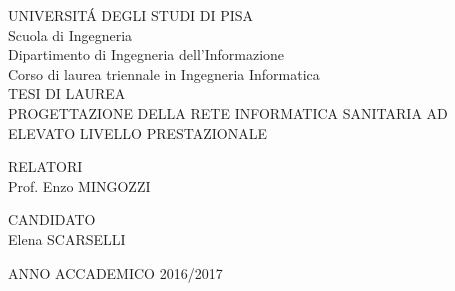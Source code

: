 \begin{titlepage}
    \begin{center}
      UNIVERSIT\'{A} DEGLI STUDI DI PISA\\
      Scuola di Ingegneria\\
      Dipartimento di Ingegneria dell'Informazione\\
      Corso di laurea triennale in Ingegneria Informatica\\
      \vspace*{5\baselineskip}
      TESI DI LAUREA\\
      PROGETTAZIONE DELLA RETE INFORMATICA SANITARIA AD ELEVATO LIVELLO PRESTAZIONALE
      \vspace*{10\baselineskip}      
    \end{center}
    
    \begin{flushleft}
      RELATORI\\
      Prof. Enzo MINGOZZI\\
    \end{flushleft}
    
    \begin{flushright}
      CANDIDATO\\
      Elena SCARSELLI
    \end{flushright}
    \vspace{\fill}
    \begin{center}
        ANNO ACCADEMICO 2016/2017
    \end{center}
\end{titlepage}